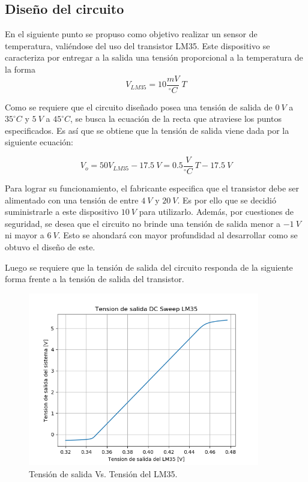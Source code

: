 \documentclass[a4paper]{article}
\begin{document}
\subsection{Diseño del circuito}

En el siguiente punto se propuso como objetivo realizar un sensor de temperatura, valiéndose del uso del transistor LM35. Este dispositivo se caracteriza por entregar a la salida una tensión proporcional a la temperatura de la forma
\[
	V_{LM35} = 10 \frac{mV}{^{\circ}C} \ T
\]

Como se requiere que el circuito diseñado posea una tensión de salida de $ 0 \ V $ a $ 35 ^{\circ}C $ y $ 5 \ V $ a $ 45 ^{\circ}C $, se busca la ecuación de la recta que atraviese los puntos especificados. Es así que se obtiene que la tensión de salida viene dada por la siguiente ecuación:

\begin{equation}
	V_{o} = 50V_{LM35} - 17.5 \ V =  0.5 \frac{V}{^{\circ}C} \ T - 17.5 \ V
	\label{equ:sistema}
\end{equation}

Para lograr su funcionamiento, el fabricante especifica que el transistor debe ser alimentado con una tensión de entre $4 \ V$ y $20 \ V$. Es por ello que se decidió suministrarle a este dispositivo $10 \ V$ para utilizarlo. Además, por cuestiones de seguridad, se desea que el circuito no brinde una tensión de salida menor a $-1 \ V$ ni mayor a $6 \ V$. Esto se ahondará con mayor profundidad al desarrollar como se obtuvo el diseño de este.

Luego se requiere que la tensión de salida del circuito responda de la siguiente forma frente a la tensión de salida del transistor.

\begin{figure}[H]
	\centering
	\includegraphics[width=0.9\textwidth]{Ejercicio6/Imagenes/SalidaVsVLM35.png}
\caption{Tensión de salida Vs. Tensión del LM35.}
	\label{fig:vout}
\end{figure}
\end{document}
